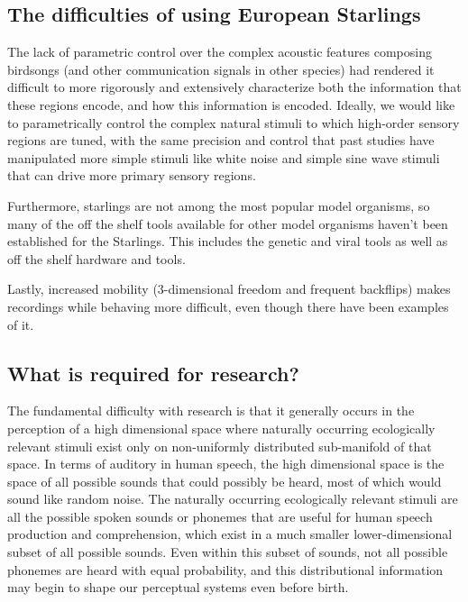 \subsection{The difficulties of using European Starlings}

The lack of parametric control over the complex acoustic features composing birdsongs (and other communication signals in other species) had rendered it difficult to more rigorously and extensively characterize both the information that these regions encode, and how this information is encoded. Ideally, we would like to parametrically control the complex natural stimuli to which high-order sensory regions are tuned, with the same precision and control that past studies have manipulated more simple stimuli like white noise and simple sine wave stimuli that can drive more primary sensory regions.

Furthermore, starlings are not among the most popular model organisms, so many of the off the shelf tools available for other model organisms haven't been established for the Starlings. This includes the genetic and viral tools as well as off the shelf hardware and tools.

Lastly, increased mobility (3-dimensional freedom and frequent backflips) makes recordings while behaving more difficult, even though there have been examples of it\cite{knudsen2013active,bluvas2013attention}.

\subsection{What is required for \CP research?}

The fundamental difficulty with \CP research is that it generally occurs in the perception of a high dimensional space where naturally occurring ecologically relevant stimuli exist only on non-uniformly distributed sub-manifold of that space. In terms of auditory \CP in human speech, the high dimensional space is the space of all possible sounds that could possibly be heard, most of which would sound like random noise. The naturally occurring ecologically relevant stimuli are all the possible spoken sounds or phonemes that are useful for human speech production and comprehension, which exist in a much smaller lower-dimensional subset of all possible sounds. Even within this subset of sounds, not all possible phonemes are heard with equal probability, and this distributional information may begin to shape our perceptual systems even before birth.

